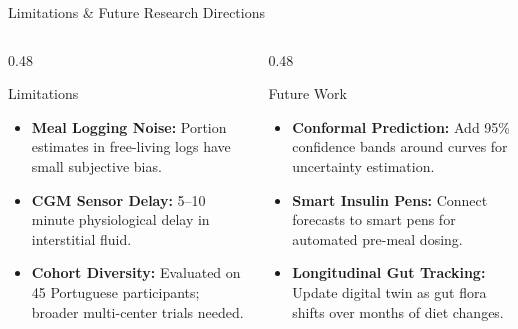 \documentclass[aspectratio=169, 10pt]{beamer}
\begin{document}
\begin{frame}{Limitations \& Future Research Directions}
  \begin{columns}[c]
    \begin{column}{0.48\textwidth}
      \begin{alertblock}{Limitations}
        \begin{itemize}\setlength{\itemsep}{0.5em}
          \item \textbf{Meal Logging Noise:} Portion estimates in free-living logs have small subjective bias.
          \item \textbf{CGM Sensor Delay:} 5--10 minute physiological delay in interstitial fluid.
          \item \textbf{Cohort Diversity:} Evaluated on 45 Portuguese participants; broader multi-center trials needed.
        \end{itemize}
      \end{alertblock}
    \end{column}
    
    \begin{column}{0.48\textwidth}
      \begin{exampleblock}{Future Work}
        \begin{itemize}\setlength{\itemsep}{0.5em}
          \item \textbf{Conformal Prediction:} Add 95\% confidence bands around curves for uncertainty estimation.
          \item \textbf{Smart Insulin Pens:} Connect forecasts to smart pens for automated pre-meal dosing.
          \item \textbf{Longitudinal Gut Tracking:} Update digital twin as gut flora shifts over months of diet changes.
        \end{itemize}
      \end{exampleblock}
    \end{column}
  \end{columns}
\end{frame}
\end{document}

